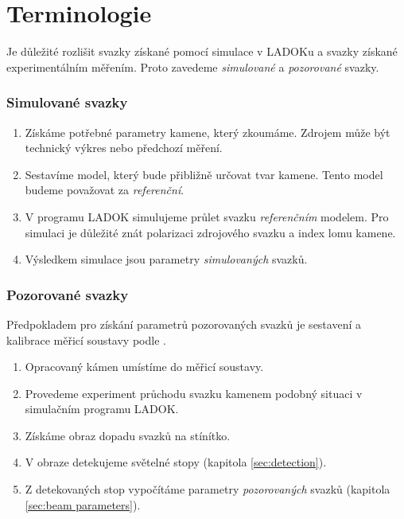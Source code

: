 \part{Terminologie}

Je důležité rozlišit svazky získané pomocí simulace v LADOKu a svazky získané experimentálním měřením.   
Proto zavedeme \textit{simulované} a \textit{pozorované} svazky.
\vspace{4mm}
\section{Simulované svazky}
\begin{enumerate}

\item 	Získáme potřebné parametry kamene, který zkoumáme. Zdrojem může být technický výkres nebo předchozí měření.  

\item	Sestavíme model, který bude přibližně určovat tvar kamene. Tento model budeme po\-va\-žo\-vat za \textit{referenční}.

\item	V programu LADOK simulujeme průlet svazku \textit{referenčním} modelem. Pro simulaci je důležité znát polarizaci zdrojového svazku a index lomu kamene. 

\item	Výsledkem simulace jsou parametry \textit{simulovaných} svazků.

\end{enumerate}

\section{Pozorované svazky}
Předpokladem pro získání parametrů pozorovaných svazků je sestavení a kalibrace měřicí soustavy podle \cite{Drapela}. %
\begin{enumerate}

\item 	Opracovaný kámen umístíme do měřicí soustavy.

\item	Provedeme experiment průchodu svazku kamenem podobný situaci v simulačním programu LADOK. 

\item	Získáme obraz dopadu svazků na stínítko. 

\item	V obraze detekujeme světelné stopy (kapitola \ref{sec:detection}).  

\item	Z detekovaných stop vypočítáme parametry \textit{pozorovaných} svazků (kapitola \ref{sec:beam parameters}).

\end{enumerate}

